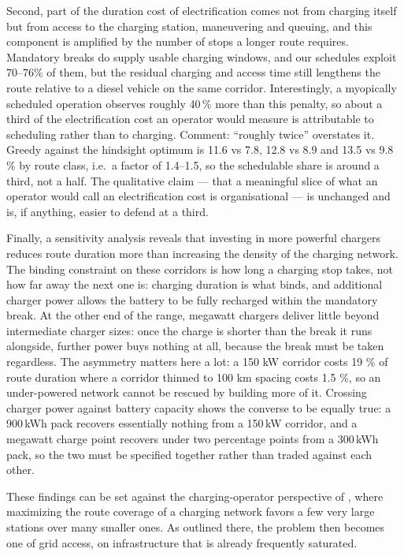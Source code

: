 \documentclass[preprint,12pt,3p]{elsarticle}
\newcommand{\green}[1]{{\color{darkgreen}#1}}
\newcommand{\blue}[1]{{\color{darkblue}#1}}
\begin{document}
{\color{red}
Second, part of the duration cost of electrification comes not from charging itself but from access to the charging station, maneuvering and queuing, and this component is amplified by the number of stops a longer route requires. Mandatory breaks do supply usable charging windows, and our schedules exploit \blue{70--76\%} of them, but the residual charging and access time still lengthens the route relative to a diesel vehicle on the same corridor. Interestingly, a myopically scheduled operation observes \blue{roughly 40\,\% more than} this penalty, so about \blue{a third} of the electrification cost an operator would measure is attributable to scheduling rather than to charging.}
\green{Comment: ``roughly twice'' overstates it. Greedy against the hindsight optimum is
11.6 vs 7.8, 12.8 vs 8.9 and 13.5 vs 9.8\,\% by route class, i.e.\ a factor of
1.4--1.5, so the schedulable share is around a third, not a half. The qualitative
claim --- that a meaningful slice of what an operator would call an electrification
cost is organisational --- is unchanged and is, if anything, easier to defend at a
third.}

Finally, a sensitivity analysis reveals that investing in more powerful chargers reduces route duration more than increasing the density of the charging network. The binding constraint on these corridors is how long a charging stop takes, not how far away the next one is: charging duration is what binds, and additional charger power allows the battery to be fully recharged within the mandatory break. At the other end of the range, megawatt chargers deliver little beyond intermediate charger sizes: once the charge is shorter than the break it runs alongside, further power buys nothing at all, because the break must be taken regardless. The asymmetry matters here a lot: a 150 kW corridor costs 19 \% of route duration where a corridor thinned to 100 km spacing costs 1.5 \%, so an under-powered network cannot be rescued by building more of it. \blue{Crossing charger power against battery capacity shows the converse to be equally true: a 900\,kWh pack recovers essentially nothing from a 150\,kW corridor, and a megawatt charge point recovers under two percentage points from a 300\,kWh pack, so the two must be specified together rather than traded against each other.}

These findings can be set against the charging-operator perspective of \citet{pagnier_charging_2026}, where maximizing the route coverage of a charging network favors a few very large stations over many smaller ones. As outlined there, the problem then becomes one of grid access, on infrastructure that is already frequently saturated.
\end{document}
